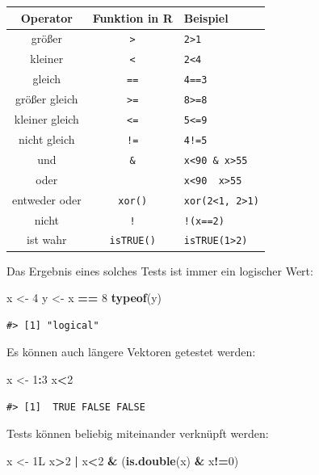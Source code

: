 \documentclass[]{book}
\newenvironment{Shaded}{\begin{snugshade}}{\end{snugshade}}
\newcommand{\KeywordTok}[1]{\textcolor[rgb]{0.13,0.29,0.53}{\textbf{#1}}}
\newcommand{\DecValTok}[1]{\textcolor[rgb]{0.00,0.00,0.81}{#1}}
\newcommand{\StringTok}[1]{\textcolor[rgb]{0.31,0.60,0.02}{#1}}
\newcommand{\OperatorTok}[1]{\textcolor[rgb]{0.81,0.36,0.00}{\textbf{#1}}}
\newcommand{\NormalTok}[1]{#1}
\begin{document}
\begin{longtable}[]{@{}ccl@{}}
\toprule
Operator & Funktion in R & Beispiel\tabularnewline
\midrule
\endhead
größer & \texttt{\textgreater{}} &
\texttt{2\textgreater{}1}\tabularnewline
kleiner & \texttt{\textless{}} & \texttt{2\textless{}4}\tabularnewline
gleich & \texttt{==} & \texttt{4==3}\tabularnewline
größer gleich & \texttt{\textgreater{}=} &
\texttt{8\textgreater{}=8}\tabularnewline
kleiner gleich & \texttt{\textless{}=} &
\texttt{5\textless{}=9}\tabularnewline
nicht gleich & \texttt{!=} & \texttt{4!=5}\tabularnewline
und & \texttt{\&} &
\texttt{x\textless{}90\ \&\ x\textgreater{}55}\tabularnewline
oder & \texttt{\textbar{}} &
\texttt{x\textless{}90\ \textbar{}\ x\textgreater{}55}\tabularnewline
entweder oder & \texttt{xor()} &
\texttt{xor(2\textless{}1,\ 2\textgreater{}1)}\tabularnewline
nicht & \texttt{!} & \texttt{!(x==2)}\tabularnewline
ist wahr & \texttt{isTRUE()} &
\texttt{isTRUE(1\textgreater{}2)}\tabularnewline
\bottomrule
\end{longtable}

Das Ergebnis eines solches Tests ist immer ein logischer Wert:

\begin{Shaded}
\begin{Highlighting}[]
\NormalTok{x <-}\StringTok{ }\DecValTok{4}
\NormalTok{y <-}\StringTok{ }\NormalTok{x }\OperatorTok{==}\StringTok{ }\DecValTok{8}
\KeywordTok{typeof}\NormalTok{(y)}
\end{Highlighting}
\end{Shaded}

\begin{verbatim}
#> [1] "logical"
\end{verbatim}

Es können auch längere Vektoren getestet werden:

\begin{Shaded}
\begin{Highlighting}[]
\NormalTok{x <-}\StringTok{ }\DecValTok{1}\OperatorTok{:}\DecValTok{3}
\NormalTok{x}\OperatorTok{<}\DecValTok{2}
\end{Highlighting}
\end{Shaded}

\begin{verbatim}
#> [1]  TRUE FALSE FALSE
\end{verbatim}

Tests können beliebig miteinander verknüpft werden:

\begin{Shaded}
\begin{Highlighting}[]
\NormalTok{x <-}\StringTok{ }\NormalTok{1L}
\NormalTok{x}\OperatorTok{>}\DecValTok{2} \OperatorTok{|}\StringTok{ }\NormalTok{x}\OperatorTok{<}\DecValTok{2} \OperatorTok{&}\StringTok{ }\NormalTok{(}\KeywordTok{is.double}\NormalTok{(x) }\OperatorTok{&}\StringTok{ }\NormalTok{x}\OperatorTok{!=}\DecValTok{0}\NormalTok{)}
\end{Highlighting}
\end{Shaded}
\end{document}
